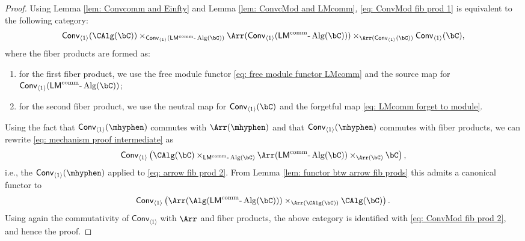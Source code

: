 \documentclass[10pt]{amsart}
\theoremstyle{remark}
\newcommand{\on}{\operatorname}
\newcommand{\lAlg}{\text{-}\on{Alg}}
\newcommand{\Conv}{\mathsf{Conv}}
\newcommand{\LMcomm}{\mathsf{LM}^{\on{comm}}}
\begin{document}
\begin{proof}
    Using Lemma \ref{lem: Convcomm and Einfty} and Lemma \ref{lem: ConvcMod and LMcomm}, \eqref{eq: ConvMod fib prod 1} is equivalent to the following category:
    \begin{equation}\label{eq: mechanism proof intermediate}
        \Conv_{\langle
    1\rangle}(\CAlg(\bC))\times_{\Conv_{\langle 1\rangle}(\LMcomm\lAlg(\bC))}\Arr(\Conv_{\langle 1\rangle}(\LMcomm\lAlg(\bC)))\times_{\Arr(\Conv_{\langle 1\rangle}(\bC))}\Conv_{\langle 1\rangle}(\bC),
    \end{equation}
    where the fiber products are formed as:
    \begin{enumerate}
        \item for the first fiber product, we use the free module functor \eqref{eq: free module functor LMcomm} and the source map for $\Conv_{\langle 1\rangle}(\LMcomm\lAlg(\bC))$;
        \item for the second fiber product, we use the neutral map for $\Conv_{\langle 1\rangle}(\bC)$ and the forgetful map \eqref{eq: LMcomm forget to module}.
    \end{enumerate}

    Using the fact that $\Conv_{\langle 1\rangle}(\mhyphen)$ commutes with $\Arr(\mhyphen)$ and that $\Conv_{\langle 1\rangle}(\mhyphen)$ commutes with fiber products, we can rewrite \eqref{eq: mechanism proof intermediate} as \[\Conv_{\langle 1\rangle}\left( \CAlg(\bC)\times_{\LMcomm\lAlg(\bC)} \Arr(\LMcomm\lAlg(\bC))\times_{\Arr(\bC)}\bC\right),\]
    i.e., the $\Conv_{\langle 1\rangle}(\mhyphen)$ applied to \eqref{eq: arrow fib prod 2}. From Lemma \ref{lem: functor btw arrow fib prods} this admits a canonical functor to
    \[\Conv_{\langle 1\rangle}\left(\Arr(\Alg(\LMcomm\lAlg(\bC)))\times_{\Arr(\CAlg(\bC))}\CAlg(\bC)\right).\]
    Using again the commutativity of  $\Conv_{\langle 1\rangle}$ with $\Arr$ and fiber products, the above category is identified with \eqref{eq: ConvMod fib prod 2}, and hence the proof.
\end{proof}
\end{document}
